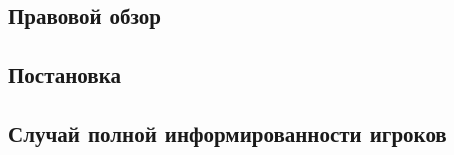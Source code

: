 

\subsection{Правовой обзор}


\subsection{Постановка}



\subsection{Случай полной информированности игроков}



